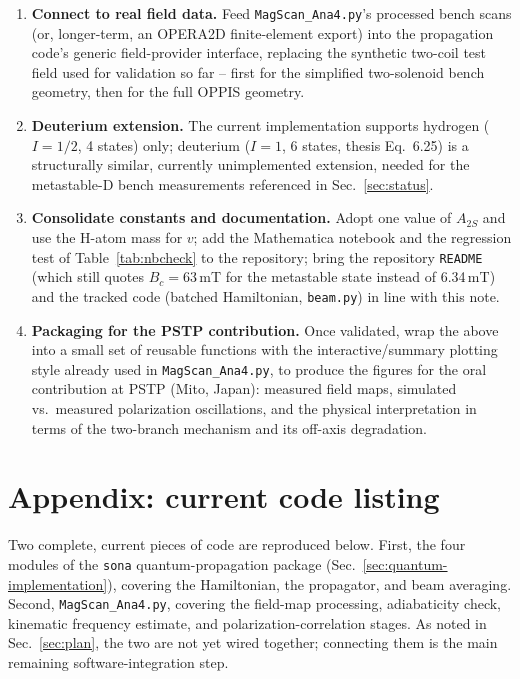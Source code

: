 \documentclass[11pt,a4paper]{article}
\begin{document}
\begin{enumerate}[label=\textbf{(\arabic*)}]
    \item \textbf{Connect to real field data.} Feed \texttt{MagScan\_Ana4.py}'s
    processed bench scans (or, longer-term, an OPERA2D finite-element
    export) into the propagation code's generic field-provider interface,
    replacing the synthetic two-coil test field used for validation so far
    -- first for the simplified two-solenoid bench geometry, then for the
    full OPPIS geometry.

    \item \textbf{Deuterium extension.} The current implementation supports
    hydrogen ($I=1/2$, 4 states) only; deuterium ($I=1$, 6 states, thesis
    Eq.~6.25) is a structurally similar, currently unimplemented extension,
    needed for the metastable-D bench measurements referenced in
    Sec.~\ref{sec:status}.

    \item \textbf{Consolidate constants and documentation.} Adopt one value of
    $A_{2S}$ and use the H-atom mass for $v$; add the Mathematica notebook and
    the regression test of Table~\ref{tab:nbcheck} to the repository; bring
    the repository \texttt{README} (which still quotes $B_c=63$\,mT for the
    metastable state instead of 6.34\,mT) and the tracked code (batched
    Hamiltonian, \texttt{beam.py}) in line with this note.

    \item \textbf{Packaging for the PSTP contribution.}
    Once validated, wrap the above into a small set of reusable functions
    with the interactive/summary plotting style already used in
    \texttt{MagScan\_Ana4.py}, to produce the figures for the oral
    contribution at PSTP (Mito, Japan): measured field maps, simulated vs.\
    measured polarization oscillations, and the physical interpretation in
    terms of the two-branch mechanism and its off-axis degradation.

\end{enumerate}

\section*{Appendix: current code listing}
\addcontentsline{toc}{section}{Appendix: current code listing}

Two complete, current pieces of code are reproduced below. First, the four
modules of the \texttt{sona} quantum-propagation package
(Sec.~\ref{sec:quantum-implementation}), covering the Hamiltonian, the
propagator, and beam averaging. Second, \texttt{MagScan\_Ana4.py}, covering
the field-map processing, adiabaticity check, kinematic frequency estimate,
and polarization-correlation stages. As noted in Sec.~\ref{sec:plan}, the
two are not yet wired together; connecting them is the main remaining
software-integration step.
\end{document}
